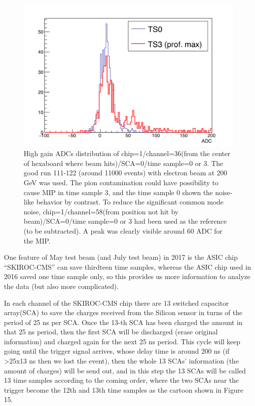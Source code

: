 \documentclass{article}
\begin{document}
\begin{figure}
\centering
\includegraphics[width=1.\textwidth]{figures/MIP_ch1_36_ref_ch1_58.png}
\caption{High gain ADCs distribution of chip=1/channel=36(from the center of hexaboard where beam hits)/SCA=0/time sample=0 or 3. The good run 111-122 (around 11000 events) with electron beam at 200 GeV was used. The pion contamination could have possibility to cause MIP in time sample 3, and the time sample 0 shown the noise-like behavior by contrast. To reduce the significant common mode noise, chip=1/channel=58(from position not hit by beam)/SCA=0/time sample=0 or 3 had been used as the reference (to be subtracted). A peak was clearly visible around 60 ADC for the MIP.} 
\label{pics:blablabla}
\end{figure}


One feature of May test beam (and July test beam) in 2017 is the ASIC chip ``SKIROC-CMS'' can save thirdteen time samples, whereas the ASIC chip used in 2016 saved one time sample only, so this provides us more information to analyze the data (but also more complicated). 

In each channel of the SKIROC-CMS chip there are 13 switched capacitor array(SCA) to save the charges received from the Silicon sensor in turns of the period of 25 ns per SCA. Once the 13-th SCA has been charged the amount in that 25 ns period, then the first SCA will be discharged (erase original information) and charged again for the next 25 ns period. This cycle will keep going until the trigger signal arrives, whose delay time is around 200 ns (if \textgreater 25x13 ns then we lost the event), then the whole 13 SCAs' information (the amount of charges) will be send out, and in this step the 13 SCAs will be called 13 time samples according to the coming order, where the two SCAs near the trigger become the 12th and 13th time samples as the cartoon shown in Figure 15.    
\end{document}
